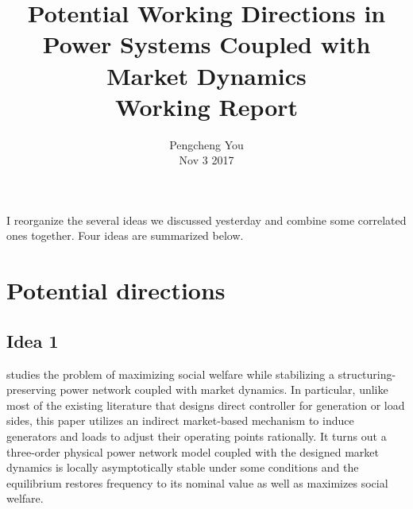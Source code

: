 \documentclass[journal,12pt,onecolumn,draftclsnofoot]{IEEEtran}
\begin{document}
\title{Potential Working Directions in Power Systems Coupled with Market Dynamics \\ \Large{Working Report}}


\author{Pengcheng You \\  Nov 3 2017%
}


\maketitle


%

%
%


\IEEEpeerreviewmaketitle


I reorganize the several ideas we discussed yesterday and combine some correlated ones together. Four ideas are summarized below.

\section{Potential directions}

\subsection{Idea 1}

\cite{stegink2016stabilization} studies the problem of maximizing social welfare while stabilizing a structuring-preserving power network coupled with market dynamics. In particular, unlike most of the existing literature that designs direct controller for generation or load sides, this paper utilizes an indirect market-based mechanism to induce generators and loads to adjust their operating points rationally. It turns out a three-order physical power network model coupled with the designed market dynamics is locally asymptotically stable under some conditions and the equilibrium restores frequency to its nominal value as well as maximizes social welfare.
\end{document}
